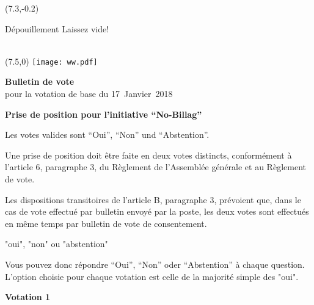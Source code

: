 \documentclass[11pt, a4paper]{scrartcl}
\begin{document}
{\begin{minipage}[t][12.5cm][t]{\textwidth}
\begin{textblock}{6}(7.3,-0.2)
\begin{framed}
Dépouillement \hfill Laissez vide! \\
\vspace{1.5cm} ~ \\
\end{framed}
\end{textblock}


\end{minipage}

\newpage

\begin{minipage}[t][12.5cm][t]{\textwidth}

\begin{textblock}{6}(7.5,0)
\texttt{[image: ww.pdf]}
\end{textblock}

{\LARGE\textbf{Bulletin de vote}} \\
pour la votation de base du 17~Janvier~2018 \\

\vspace{2cm}

\textbf{Prise de position pour l'initiative \enquote{No-Billag}}

\vspace{0.1cm}
Les votes valides sont \enquote{Oui}, \enquote{Non} und \enquote{Abstention}.

\vspace{0.1cm}
Une prise de position doit être faite en deux votes distincts, conformément à l'article 6, paragraphe 3, du Règlement de l'Assemblée générale et au Règlement de vote.

Les dispositions transitoires de l'article B, paragraphe 3, prévoient que, dans le cas de vote effectué par bulletin envoyé par la poste, les deux votes sont effectués en même temps par bulletin de vote de consentement.

 "oui", "non" ou "abstention"  

\vspace{0.1cm}
Vous pouvez donc répondre \enquote{Oui}, \enquote{Non} oder \enquote{Abstention} à chaque question. L'option choisie pour chaque votation est celle de la majorité simple des "oui".

\vspace{1cm}

\textbf{Votation 1}

\vspace{0.5cm}


\end{minipage}}
\end{document}
